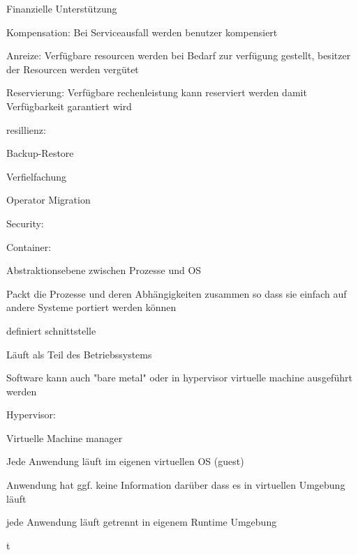 \begin{notes}
\begin{notes}
\begin{notes}
\begin{notes}
            \end{notes}
            \item Finanzielle Unterstützung
            \begin{notes}
                \item Kompensation: Bei Serviceausfall werden benutzer kompensiert
                \item Anreize: Verfügbare resourcen werden bei Bedarf zur verfügung gestellt, besitzer der Resourcen werden vergütet
                \item Reservierung: Verfügbare rechenleistung kann reserviert werden damit Verfügbarkeit garantiert wird
            \end{notes}
            \item resillienz:
            \begin{notes}
                \item Backup-Restore
                \item Verfielfachung
                \item Operator Migration
            \end{notes}
        \end{notes}
    \end{notes}
    \item Security: \cite{Mahmud2020}
    \begin{notes}
        \item Container:
        \begin{notes}
            \item Abstraktionsebene zwischen Prozesse und OS
            \item Packt die Prozesse und deren Abhängigkeiten zusammen so dass sie einfach auf andere Systeme portiert werden können
            \item definiert schnittstelle
            \item Läuft als Teil des Betriebssystems
            \item Software kann auch "bare metal" oder in hypervisor virtuelle machine ausgeführt werden
        \end{notes}
        \item Hypervisor:
        \begin{notes}
            \item Virtuelle Machine manager
            \item Jede Anwendung läuft im eigenen virtuellen OS (guest)
            \item Anwendung hat ggf. keine Information darüber dass es in virtuellen Umgebung läuft
            \item jede Anwendung läuft getrennt in eigenem Runtime Umgebung
            \item t
        \end{notes}
    \end{notes}
\end{notes} 

